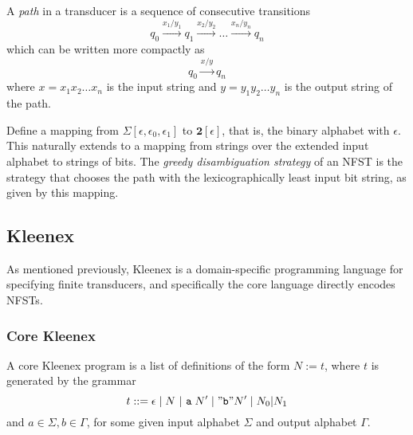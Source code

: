 A \emph{path} in a transducer is a sequence of consecutive
transitions
\[
  q_0 \xrightarrow{x_1/y_1} q_1 \xrightarrow{x_2/y_2} \dots
  \xrightarrow{x_n/y_n} q_n
\]
which can be written more compactly as
\[
  q_0 \xrightarrow{x/y} q_n
\]
where $x = x_1x_2 \dots x_n$ is the input string and $y = y_1y_2 \dots y_n$ is
the output string of the path.

Define a mapping from $\Sigma[\epsilon, \epsilon_0, \epsilon_1]$ to
$\mathbf{2}[\epsilon]$, that is, the binary alphabet with $\epsilon$. This
naturally extends to a mapping from strings over the extended input alphabet to
strings of bits. The \emph{greedy disambiguation strategy} of an NFST is the
strategy that chooses the path with the lexicographically least input bit
string, as given by this mapping.






\subsection{Kleenex}

As mentioned previously, Kleenex is a domain-specific programming language for
specifying finite transducers, and specifically the core language directly
encodes NFSTs.

\subsubsection{Core Kleenex}

\begin{definition}
  A core Kleenex program is a list of definitions of the form $N := t$, where
  $t$ is generated by the grammar
  \[
    t ::= \epsilon \;|\; N \ |\ \mathtt{a}\; N' \;|\; \mathtt{"b"} N' \;|\;
    N_0|N_1
  \]
  and $a \in \Sigma, b \in \Gamma$, for some given input alphabet $\Sigma$ and
  output alphabet $\Gamma$.
\end{definition}

